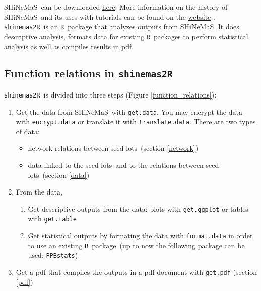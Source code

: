 \documentclass{article}\usepackage[]{graphicx}\usepackage[]{color}
\newcommand{\R}{\texttt{R}}
\renewcommand{\sl}{seed-lots}
\newcommand{\BD}{SHiNeMaS}
\newcommand{\pack}{\texttt{shinemas2R}}
\begin{document}
\BD~can be downloaded \href{http://moulon.inra.fr/index.php/en/tranverse-team/atelier-de-bioinformatique/projects/181}{here}.
More information on the history of \BD~and its uses with tutorials can be found on the \href{http://moulon.inra.fr/index.php/en/tranverse-team/atelier-de-bioinformatique/projects/181}{website} \citep{deoliveira_shinemas_2015}.\\

\pack~is an \R~package that analyzes outputs from \BD.
It does descriptive analysis, formats data for existing \R~packages to perform statistical analysis as well as compiles results in pdf.


\subsection{Function relations in \pack}

\pack~is divided into three steps (Figure \ref{function_relations}):

\begin{enumerate}
\item Get the data from \BD~with \texttt{get.data}. You may encrypt the data with \texttt{encrypt.data} or translate it with \texttt{translate.data}.
There are two types of data:
\begin{itemize}
\item network relations between \sl~(section \ref{network})
\item data linked to the \sl~and to the relations between \sl~(section \ref{data})
\end{itemize}

\item From the data,
	\begin{enumerate}
	\item Get descriptive outputs from the data: plots with \texttt{get.ggplot} or tables with \texttt{get.table}
	\item Get statistical outputs by formating the data with \texttt{format.data} in order to use an existing \R~package~(up to now the following package can be used: \texttt{PPBstats})
	\end{enumerate}
\item Get a pdf that compiles the outputs in a pdf document with \texttt{get.pdf} (section \ref{pdf})
\end{enumerate}
\end{document}
